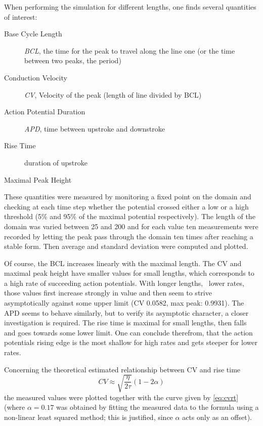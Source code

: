 When performing the simulation for different lengths, one finds several
quantities of interest:
\begin{description}
    \item[Base Cycle Length] \emph{BCL}, the time for the peak to travel along
        the line one (or the time between two peaks, the period)
    \item[Conduction Velocity] \emph{CV}, Velocity of the peak (length of line
        divided by BCL)
    \item[Action Potential Duration] \emph{APD}, time between upstroke and
        downstroke
    \item[Rise Time] duration of upstroke
    \item[Maximal Peak Height]
\end{description}

These quantities were measured by monitoring a fixed point on the domain and
checking at each time step whether the potential crossed either a low or a high
threshold (5\% and 95\% of the maximal potential respectively).
The length of the domain was varied between 25 and 200 and for each value ten
measurements were recorded by letting the peak pass through the domain ten times after
reaching a stable form. Then average and standard deviation were computed and
plotted.


Of course, the BCL increases linearly with the maximal length.  The CV and
maximal peak height have smaller values for small lengths, which corresponds to
a high rate of succeeding action potentials. With longer lengths, \ie~lower
rates, those values first increase strongly in value and then seem to strive
asymptotically against some upper limit (CV 0.0582, max peak: 0.9931).  The APD
seems to behave similarly, but to verify its asymptotic character, a closer
investigation is required.  The rise time is maximal for small lengths, then
falls and goes towards some lower limit. One can conclude therefrom, that the
action potentials rising edge is the most shallow for high rates and gets
steeper for lower rates.

Concerning the theoretical estimated relationship between CV and rise time
\begin{equation}
    CV\approx\sqrt{\frac{\eta}{2\tau}}(1-2\alpha)
    \label{eq:cvrt}
\end{equation}
the measured values were plotted together with the curve given by
\eqref{eq:cvrt} (where $\alpha=0.17$ was obtained by fitting the measured data
to the formula using a non-linear least squared method; this is justified,
since $\alpha$ acts only as an offset).

